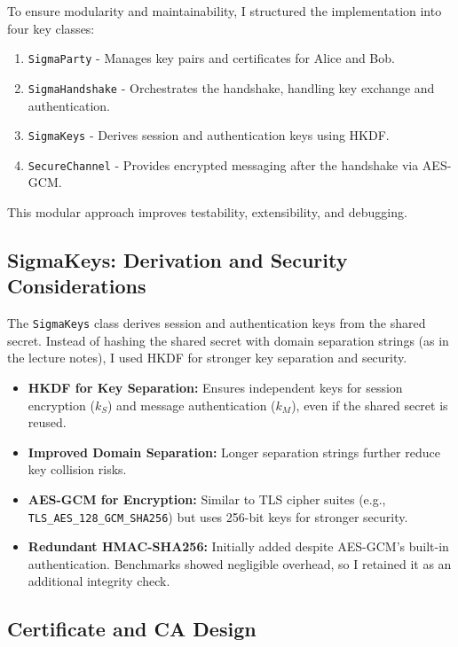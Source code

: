 \documentclass[twoside,a4paper,12pt]{article}
\begin{document}
To ensure modularity and maintainability, I structured the implementation into four key classes:

\begin{enumerate}
\item \texttt{SigmaParty} - Manages key pairs and certificates for Alice and Bob.
\item \texttt{SigmaHandshake} - Orchestrates the handshake, handling key exchange and authentication.
\item \texttt{SigmaKeys} - Derives session and authentication keys using HKDF.
\item \texttt{SecureChannel} - Provides encrypted messaging after the handshake via AES-GCM.
\end{enumerate}

This modular approach improves testability, extensibility, and debugging.

\subsection{SigmaKeys: Derivation and Security Considerations}
\label{subsec:sigma_keys}

The \texttt{SigmaKeys} class derives session and authentication keys from the shared secret. Instead of hashing the shared secret with domain separation strings (as in the lecture notes), I used HKDF for stronger key separation and security.

\begin{itemize}
    \item \textbf{HKDF for Key Separation:} Ensures independent keys for session encryption ($k_S$) and message authentication ($k_M$), even if the shared secret is reused.
    \item \textbf{Improved Domain Separation:} Longer separation strings further reduce key collision risks.
    \item \textbf{AES-GCM for Encryption:} Similar to TLS cipher suites (e.g., \texttt{TLS_AES_128_GCM_SHA256}) but uses 256-bit keys for stronger security.
    \item \textbf{Redundant HMAC-SHA256:} Initially added despite AES-GCM's built-in authentication. Benchmarks showed negligible overhead, so I retained it as an additional integrity check.
\end{itemize}


\subsection{Certificate and CA Design}
\label{subsec:sigma_ca}
\end{document}
